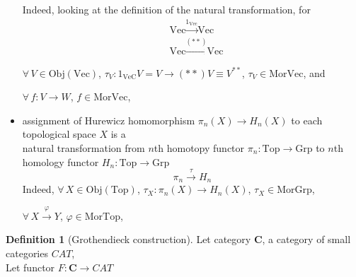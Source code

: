 \documentclass[twoside,landscape,10pt]{amsart}
\theoremstyle{plain}
\theoremstyle{definition}
\newtheorem{definition}{Definition}
\theoremstyle{remark}
\begin{document}
\begin{multicols*}{2}
\begin{itemize}
Indeed, looking at the definition of the natural transformation, for
\[
\begin{aligned}
  &  \text{Vec} \xrightarrow{ 1_{\text{Vec}} } \text{Vec} \\ 
  &  \text{Vec} \xrightarrow{ (**) } \text{Vec}
\end{aligned}
\]

$\forall \, V \in \text{Obj}(\text{Vec})$, $\tau_V:1_{\text{VeC}}V = V \to (**)V \equiv V^{**}$, $\tau_V \in \text{Mor}\text{Vec}$, and 

$\forall \, f: V\to W$, $f\in \text{Mor}\text{Vec}$,


\item assignment of Hurewicz homomorphism $\pi_n(X) \to H_n(X)$ to each topological space $X$ is a \\
natural transformation from $n$th homotopy functor $\pi_n : \text{Top} \to \text{Grp}$ to $n$th homology functor $H_n:\text{Top} \to \text{Grp}$
\[
\pi_n \xrightarrow{ \tau} H_n
\]
Indeed, $\forall \, X \in \text{Obj}(\text{Top})$, $\tau_X : \pi_n(X) \to H_n(X)$, $\tau_X \in \text{Mor}\text{Grp}$,

$\forall \, X \xrightarrow{ \varphi } Y$, $\varphi \in \text{Mor}\text{Top}$,



\end{itemize}




\begin{definition}[Grothendieck construction] Let category $\mathbf{C}$, a category of small categories $CAT$, \\
Let functor $F: \mathbf{C} \to CAT$


\end{definition}
\end{multicols*}
\end{document}
